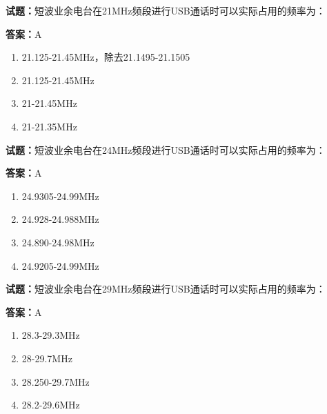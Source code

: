 \documentclass{ctexbook}
\begin{document}




\vspace{1em}

\textbf{试题：}短波业余电台在21MHz频段进行USB通话时可以实际占用的频率为： 

\textbf{答案：}A 

\begin{enumerate}[leftmargin=3em]
  \item 21.125-21.45MHz，除去21.1495-21.1505 

  \item 21.125-21.45MHz 

  \item 21-21.45MHz 

  \item 21-21.35MHz 

\end{enumerate}






\vspace{1em}

\textbf{试题：}短波业余电台在24MHz频段进行USB通话时可以实际占用的频率为： 

\textbf{答案：}A 

\begin{enumerate}[leftmargin=3em]
  \item 24.9305-24.99MHz 

  \item 24.928-24.988MHz 

  \item 24.890-24.98MHz 

  \item 24.9205-24.99MHz 

\end{enumerate}





\vspace{1em}

\textbf{试题：}短波业余电台在29MHz频段进行USB通话时可以实际占用的频率为： 

\textbf{答案：}A 

\begin{enumerate}[leftmargin=3em]
  \item 28.3-29.3MHz 

  \item 28-29.7MHz 

  \item 28.250-29.7MHz 

  \item 28.2-29.6MHz 

\end{enumerate}
\end{document}
